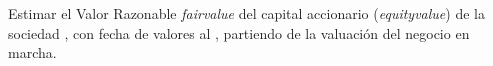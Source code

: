Estimar el Valor Razonable \textit{\gls{fairvalue}}   del capital accionario (\textit{\gls{equityvalue}}) de la sociedad \capitalAccionario, con fecha de valores al \fechaValores, partiendo de la valuaci\'on del negocio en marcha.